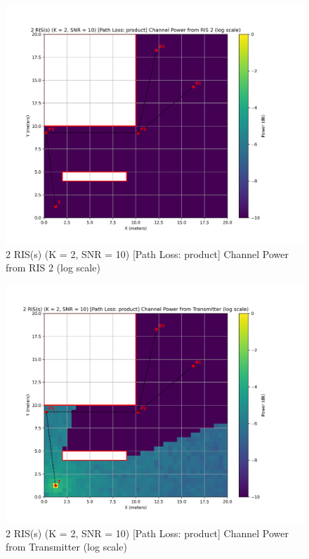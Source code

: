 \begin{figure}[H]
  \centering
  \includegraphics[width=0.8\linewidth]{imgs/heatmap-simulations/2 RIS(s) (K = 2, SNR = 10) [Path Loss_ product] Channel Power from RIS 2 (log scale).png}
  \caption{2 RIS(s) (K = 2, SNR = 10) [Path Loss: product] Channel Power from RIS 2 (log scale)}
\end{figure}

\begin{figure}[H]
  \centering
  \includegraphics[width=0.8\linewidth]{imgs/heatmap-simulations/2 RIS(s) (K = 2, SNR = 10) [Path Loss_ product] Channel Power from Transmitter (log scale).png}
  \caption{2 RIS(s) (K = 2, SNR = 10) [Path Loss: product] Channel Power from Transmitter (log scale)}
\end{figure}

